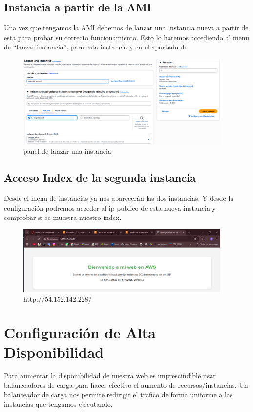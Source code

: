 \documentclass{article}
\begin{document}
\subsection{Instancia a partir de la AMI}
	Una vez que tengamos la AMI debemos de lanzar una instancia nueva a partir de esta para probar su correcto funcionamiento. Esto lo haremos accediendo al menu de ``lanzar instancia'', para esta instancia y en el apartado de 

	
	\begin{figure}[H]
	\centering
	\includegraphics[width=0.95\textwidth]{menu_lanzar_desde_imagen.png}
	\caption{panel de lanzar una instancia}
	\end{figure}

\newpage

\subsection{Acceso Index de la segunda instancia}

	Desde el menu de instancias ya nos aparecerán las dos instancias. Y desde la configuración podremos acceder al ip publico de esta nueva instancia y comprobar si se muestra nuestro index.

	\begin{figure}[H]
	\centering
	\includegraphics[width=0.95\textwidth]{index2.png}
	\caption{http://54.152.142.228/}
	\end{figure}
\newpage

\section{Configuración de Alta Disponibilidad}
	Para aumentar la disponibilidad de nuestra web es imprescindible usar balanceadores de carga para hacer efectivo el aumento de recursos/instancias. Un balanceador de carga nos permite redirigir el trafico de forma uniforme a las instancias que tengamos ejecutando. 
	
\end{document}
